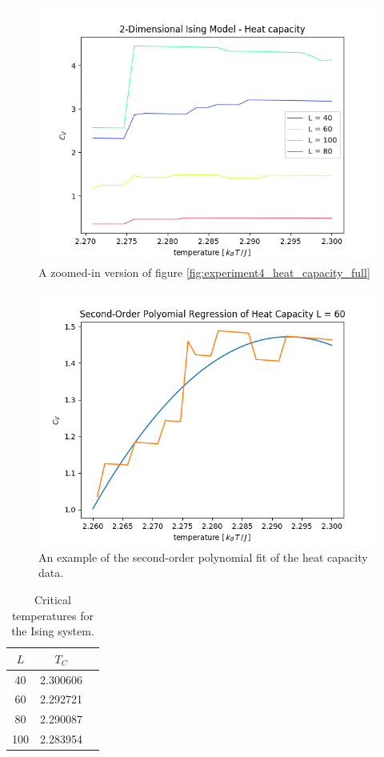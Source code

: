 \documentclass[nofootinbib,reprint,english]{revtex4-1}
\begin{document}
\begin{figure}[h!]
\centering
\includegraphics[scale=0.5]{../output/figures/experiment4/heat_capacity_zoom.png}
\caption{A zoomed-in version of figure \ref{fig:experiment4_heat_capacity_full}}\label{fig:experiment4_heat_capacity_zoom}
\end{figure}

\begin{figure}[h!]
\centering
\includegraphics[scale=0.5]{../output/figures/experiment4/polyfit_60.png}
\caption{An example of the second-order polynomial fit of the heat capacity data.}\label{fig:experiment4_polyfit}
\end{figure}

\begin{table}
\centering
\begin{tabular}{|c|c|c|}
\hline\rule{0pt}{0.32cm}
\(L\) & \(T_C\) \\\hline\rule{0pt}{0.32cm}
 40 & 2.300606 \\\hline
 60 & 2.292721 \\\hline
 80 & 2.290087 \\\hline
100 & 2.283954 \\\hline
\end{tabular}
\caption{Critical temperatures for the Ising system.}\label{tab:critical_temperatures}
\end{table}
\end{document}
